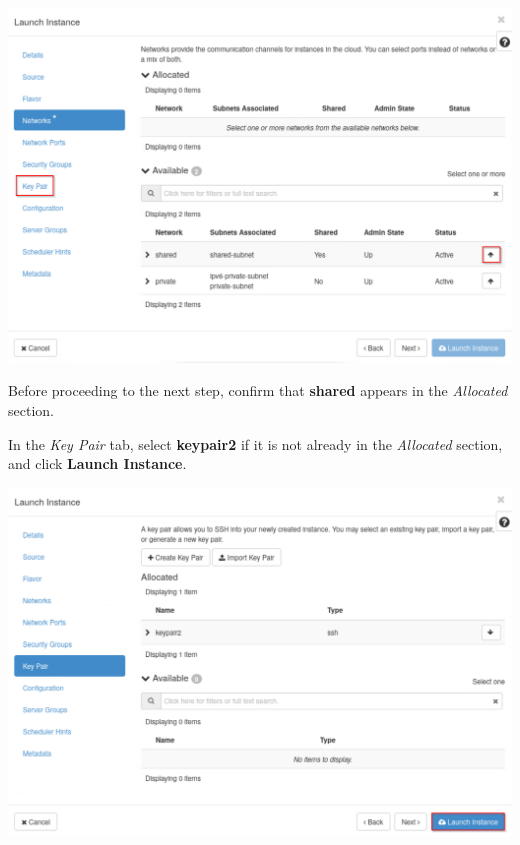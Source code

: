 \documentclass[letterpaper, 12pt]{article}
\begin{document}
\begin{enumerate}
\begin{labstep}
        \begin{center}
            \includegraphics[width=\linewidth]{images/part4/step10.png}
        \end{center}
    \end{labstep}

    \begin{stopbox}
        Before proceeding to the next step, confirm that \textbf{shared} appears in the \textit{Allocated} section.
    \end{stopbox}

    \begin{labstep}
        In the \textit{Key Pair} tab, select \textbf{keypair2} if it is not already in the \textit{Allocated} section, and click \textbf{Launch Instance}.

        \begin{center}
            \includegraphics[width=\linewidth]{images/part4/step11.png}
        \end{center}
    \end{labstep}


\end{enumerate}
\end{document}
